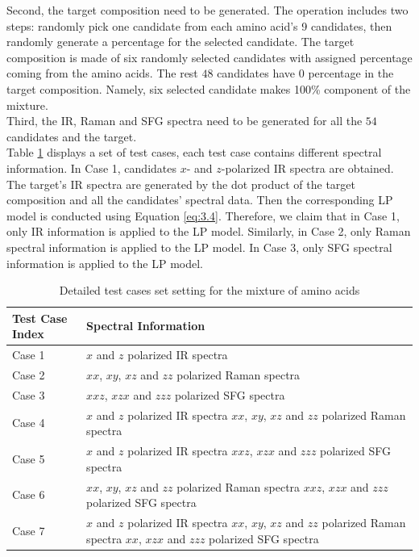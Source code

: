 Second, the target composition need to be generated. The operation includes two steps: randomly pick one candidate from each amino acid's 9 candidates, then randomly generate a percentage for the selected candidate. The target composition is made of six randomly selected candidates with assigned percentage coming from the amino acids. The rest $48$ candidates have $0$ percentage in the target composition. Namely, six selected candidate makes 100\% component of the mixture. \\

Third, the IR, Raman and SFG spectra need to be generated for all the $54$ candidates and the target. \\

Table \ref{tab:5.1} displays a set of test cases, each test case contains different spectral information. In Case 1, candidates $x$- and $z$-polarized IR spectra are obtained. The target's IR spectra are generated by the dot product of the target composition and all the candidates' spectral data. Then the corresponding LP model is conducted using Equation \ref{eq:3.4}. Therefore, we claim that in Case 1, only IR information is applied to the LP model. Similarly, in Case 2, only Raman spectral information is applied to the LP model. In Case 3, only SFG spectral information is applied to the LP model. \\

\begin{table}
\begin{center}
{\def\arraystretch{1.5}
\begin{tabular}{| l | p{3in} | }
\hline
Test Case Index & Spectral Information \\
\hline
Case 1 & $x$ and $z$ polarized IR spectra\\
\hline
Case 2 & $xx$, $xy$, $xz$ and $zz$ polarized Raman spectra \\
\hline
Case 3 & $xxz$, $xzx$ and $zzz$ polarized SFG spectra \\
\hline
Case 4 & $x$ and $z$ polarized IR spectra \newline $xx$, $xy$, $xz$ and $zz$ polarized Raman spectra \\
\hline
Case 5 & $x$ and $z$ polarized IR spectra \newline $xxz$, $xzx$ and $zzz$ polarized SFG spectra　\\
\hline
Case 6 & $xx$, $xy$, $xz$ and $zz$ polarized Raman spectra \newline $xxz$, $xzx$ and $zzz$ polarized SFG spectra \\
\hline
Case 7 & $x$ and $z$ polarized IR spectra \newline
 $xx$, $xy$, $xz$ and $zz$ polarized Raman spectra \newline 
 $xx$, $xzx$ and $zzz$ polarized SFG spectra \\
\hline
\end{tabular} 
}
\end{center}
\caption{Detailed test cases set setting for the mixture of amino acids} 
\label{tab:5.1} 
\end{table}	

